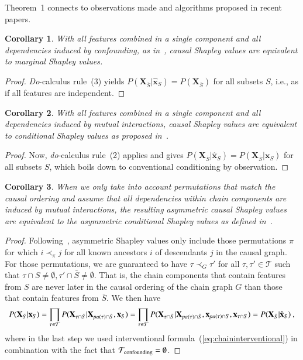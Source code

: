 \documentclass{article}
\newcommand{\vX}{\mathbf{X}}
\newcommand{\vx}{\mathbf{x}}
\newcommand{\svdo}[1]{\hat{\vx}_{#1}}
\newcommand{\spa}{\mathop{\textit{\scriptsize pa}}}
\newcommand{\perm}{\pi}
\newcommand{\onder}[2]{{#1}_{\mbox{\scriptsize #2}}}
\newcommand{\chaincomponents}{{\cal T}}
\newtheorem{corollary}{Corollary}
\begin{document}
Theorem~1 connects to observations made and algorithms proposed in recent papers.
\begin{corollary}
	With all features combined in a single component and all dependencies induced by confounding, as in~\cite{janzing2019feature}, causal Shapley values are equivalent to marginal Shapley values. 
\end{corollary}
\begin{proof}
	{\em Do}-calculus rule~(3) yields $P(\vX_{\bar{S}}|\svdo{S}) = P(\vX_{\bar{S}})$ for all subsets $S$, i.e., as if all features are independent.
\end{proof}
\begin{corollary}
	With all features combined in a single component and all dependencies induced by mutual interactions, causal Shapley values are equivalent to conditional Shapley values as proposed in~\cite{aas2019explaining}.
\end{corollary}
\begin{proof}
	Now, {\em do}-calculus rule~(2) applies and gives $P(\vX_{\bar{S}}|\svdo{S}) = P(\vX_{\bar{S}}|\vx_{S})$ for all subsets $S$, which boils down to conventional conditioning by observation.
\end{proof}
\begin{corollary}
	When we only take into account permutations that match the causal ordering and assume that all dependencies within chain components are induced by mutual interactions, the resulting asymmetric causal Shapley values are equivalent to the asymmetric conditional Shapley values as defined in~\cite{frye2019asymmetric}.
\end{corollary}
\begin{proof}
	Following~\cite{frye2019asymmetric}, asymmetric Shapley values only include those permutations $\perm$ for which $i \prec_\perm j$ for all known ancestors $i$ of descendants $j$ in the causal graph. For those permutations, we are guaranteed to have $\tau \prec_G \tau'$ for all $\tau, \tau' \in \mathcal{T}$ such that $\tau \cap S \neq \emptyset, \tau' \cap \bar{S} \neq \emptyset$. That is, the chain components that contain features from $S$ are never later in the causal ordering of the chain graph $G$ than those that contain features from $\bar{S}$. We then have
	\[
	P(\vX_{\bar{S}}|\vx_S) = \prod_{\tau \in \chaincomponents} P(\vX_{\tau \cap \bar{S}}|\vX_{\spa(\tau)  \cap \bar{S}},\vx_{S}) = \prod_{\tau \in \chaincomponents} P(\vX_{\tau \cap \bar{S}}|\vX_{\spa(\tau)  \cap \bar{S}},\vx_{\spa(\tau) \cap S},\vx_{\tau \cap S}) = P(\vX_{\bar{S}}|\svdo{S}) \: ,
	\]
	where in the last step we used interventional formula~(\ref{eq:chaininterventional}) in combination with the fact that $\onder{\chaincomponents}{confounding} = \emptyset$.
\end{proof}
\end{document}

